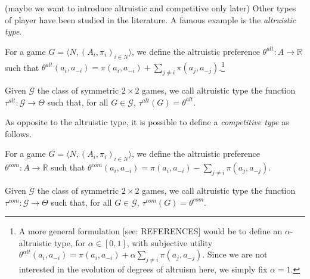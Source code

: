 \documentclass[fleqn,reqno,11pt]{article}
\begin{document}
\iffalse
(maybe we want to introduce altruistic and competitive only later) Other types of player have been studied in the literature. A famous example is the \textit{altruistic type}.

\begin{definition} \label{defn:altpref}

For a game $ G=\langle N, (A_i , \pi_i)_{i \in N} \rangle $, we define the altruistic preference $ \theta^{alt}: A \rightarrow \mathbb{R} $ such that $ \theta^{alt}(a_i,a_{-i})=\pi(a_i,a_{-i}) + \sum_{j \neq i} \pi(a_{j},a_{-j})$.\footnote{A more general formulation [see: REFERENCES] would be to define an $ \alpha$-altruistic type, for $\alpha \in [0,1]$, with subjective utility $ \theta^{\alpha lt}(a_i,a_{-i})=\pi(a_i,a_{-i}) + \alpha \sum_{j \neq i} \pi(a_{j},a_{-j})$. Since we are not interested in the evolution of degrees of altruism here, we simply fix $ \alpha = 1 $.}

\end{definition}

\begin{definition} \label{defn:alttype}

Given $ \mathcal{G} $ the class of symmetric $ 2 \times 2 $ games, we call altruistic type the function $\tau^{alt}: \mathcal{G} \rightarrow  \Theta$ such that, for all $G \in \mathcal{G}$, $ \tau^{alt}(G)= \theta^{alt}$.

\end{definition}

\noindent As opposite to the altruistic type, it is possible to define a \textit{competitive type} as follows. 

\begin{definition} \label{defn:compref}

For a game $ G=\langle N, (A_i , \pi_i)_{i \in N} \rangle $, we define the altruistic preference $ \theta^{com}: A \rightarrow \mathbb{R} $ such that $ \theta^{com}(a_i,a_{-i})=\pi(a_i,a_{-i}) - \sum_{j \neq i} \pi(a_{j},a_{-j})$.

\end{definition}

\begin{definition} \label{defn:comtype}

Given $ \mathcal{G} $ the class of symmetric $ 2 \times 2 $ games, we call altruistic type the function $\tau^{com}: \mathcal{G} \rightarrow  \Theta$ such that, for all $G \in \mathcal{G}$, $ \tau^{com}(G)= \theta^{com}$.

\end{definition}
\end{document}
